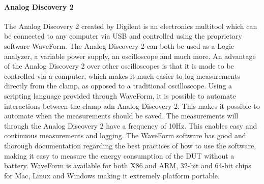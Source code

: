 \paragraph*{Analog Discovery 2}\label{par:AnalDisc2}
The Analog Discovery 2 created by Digilent\cite{AnalogDiscovery2} is an electronics multitool which can be connected to any computer via USB and controlled using the proprietary software WaveForm. The Analog Discovery 2 can both be used as a Logic analyzer, a variable power supply, an oscilloscope and much more\cite{AnalogDoc}. An advantage of the Analog Discovery 2 over other oscilloscopes is that it is made to be controlled via a computer, which makes it much easier to log measurements directly from the clamp, as opposed to a traditional oscilloscope. Using a scripting language provided through WaveForm, it is possible to automate interactions between the clamp adn Analog Discovery 2. This makes it possible to automate when the measurements should be saved. The measurements will through the Analog Discovery 2 have a frequency of 10Hz. This enables easy and continuous measurements and logging. The WaveForm software has good and thorough documentation regarding the best practices of how to use the software, making it easy to measure the energy consumption of the DUT without a battery. WaveForm is available for both X86 and ARM, 32-bit and 64-bit chips for Mac, Linux and Windows making it extremely platform portable.\cite{AnalogDoc}